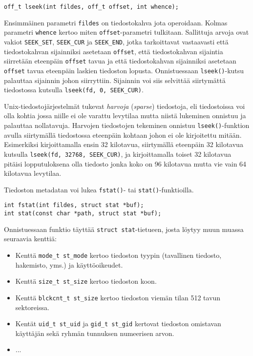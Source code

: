 \begin{verbatim}
off_t lseek(int fildes, off_t offset, int whence);
\end{verbatim}
Ensimmäinen parametri \texttt{fildes} on tiedostokahva jota operoidaan.
Kolmas parametri \texttt{whence} kertoo miten \texttt{offset}-parametri tulkitaan.
Sallittuja arvoja ovat vakiot \texttt{SEEK\_SET}, \texttt{SEEK\_CUR} ja \texttt{SEEK\_END},
jotka tarkoittavat vastaavasti että tiedostokahvan sijainniksi asetetaan \texttt{offset},
että tiedostokahvan sijaintia siirretään eteenpäin \texttt{offset} tavua ja
että tiedostokahvan sijainniksi asetetaan \texttt{offset} tavua eteenpäin laskien tiedoston lopusta.
Onnistuessaan \texttt{lseek()}-kutsu palauttaa sijainnin johon siirryttiin.
Sijainnin voi siis selvittää siirtymättä tiedostossa kutsulla \texttt{lseek(fd, 0, SEEK\_CUR)}.

Unix-tiedostojärjestelmät tukevat \emph{harvoja} (\emph{sparse}) tiedostoja,
eli tiedostoissa voi olla kohtia jossa niille ei ole varattu levytilaa mutta niistä lukeminen onnistuu ja palauttaa nollatavuja.
Harvojen tiedostojen tekeminen onnistuu \texttt{lseek()}-funktion avulla siirtymällä tiedostossa eteenpäin kohtaan johon ei ole kirjoitettu mitään.
Esimerkiksi kirjoittamalla ensin 32 kilotavua,
siirtymällä eteenpäin 32 kilotavua kutsulla \texttt{lseek(fd, 32768, SEEK\_CUR)},
ja kirjoittamalla toiset 32 kilotavua pitäisi lopputuloksena olla tiedosto jonka koko on 96 kilotavua mutta vie vain 64 kilotavua levytilaa.

Tiedoston metadatan voi lukea \texttt{fstat()}- tai \texttt{stat()}-funktioilla.

\begin{verbatim}
int fstat(int fildes, struct stat *buf);
int stat(const char *path, struct stat *buf);
\end{verbatim}

Onnistuessaan funktio täyttää \texttt{struct stat}-tietueen,
josta löytyy muun muassa seuraavia kenttiä:

\begin{itemize}
    \item Kenttä \texttt{mode\_t st\_mode} kertoo tiedoston tyypin (tavallinen tiedosto, hakemisto, yms.) ja käyttöoikeudet.
    \item Kenttä \texttt{size\_t st\_size} kertoo tiedoston koon.
    \item Kenttä \texttt{blckcnt\_t st\_size} kertoo tiedoston viemän tilan 512 tavun sektoreissa.
    \item Kentät \texttt{uid\_t st\_uid} ja \texttt{gid\_t st\_gid} kertovat tiedoston omistavan käyttäjän sekä ryhmän tunnuksen numeerisen arvon.
    \item ...
\end{itemize}

